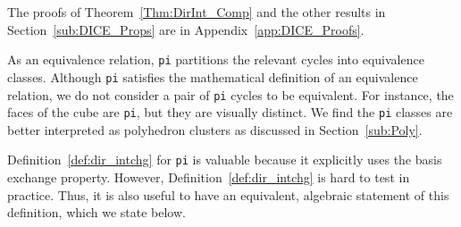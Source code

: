 \documentclass[fleqn,11pt]{article}
\newcommand\calM{\mathcal{M}}
\newcommand\expand[2]{\mathcal{E}_{#1}\left(#2\right)}   %
\begin{document}
The proofs of Theorem~\ref{Thm:DirInt_Comp} and the other results in Section~\ref{sub:DICE_Props} are in Appendix~\ref{app:DICE_Proofs}.

As an equivalence relation, {\tt pi} partitions the relevant cycles into equivalence classes. 
Although {\tt pi} satisfies the mathematical definition of an equivalence relation, we do not consider a pair of {\tt pi} cycles to be equivalent. For instance, the faces of the cube are {\tt pi}, but they are visually distinct. We find the {\tt pi} classes are better interpreted as polyhedron clusters as discussed in Section~\ref{sub:Poly}.

Definition~\ref{def:dir_intchg} for {\tt pi} is valuable because it explicitly uses the basis exchange property. 
However, Definition~\ref{def:dir_intchg} is hard to test in practice.
Thus, it is also useful to have an equivalent, algebraic statement of this definition, which we state below. 



\end{document}

